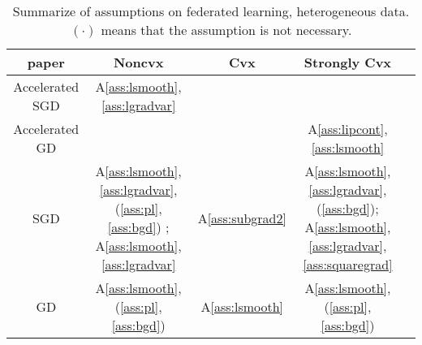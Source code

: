 \begin{table}[h!]
\centering
\small
	\begin{tabular}{|c|c|c|c|c|}\hline
		paper         & Noncvx & Cvx & Strongly Cvx\\ \hline
	Accelerated	SGD   & \cite{huo2020faster} A\ref{ass:lsmooth},\ref{ass:lgradvar} &          &             \\\hline
	Accelerated GD    &        &       &     \cite{liu2019accelerating}A\ref{ass:lipcont},\ref{ass:lsmooth}        \\\hline
	SGD    &   \cite{haddadpour2019convergence} A\ref{ass:lsmooth},\ref{ass:lgradvar},(\ref{ass:pl},\ref{ass:bgd}) ; \cite{huo2020faster}A\ref{ass:lsmooth},\ref{ass:lgradvar}  & A\ref{ass:subgrad2}  &   \cite{haddadpour2019convergence} A\ref{ass:lsmooth},\ref{ass:lgradvar},(\ref{ass:bgd}); \cite{li2019convergence} A\ref{ass:lsmooth},\ref{ass:lgradvar},\ref{ass:squaregrad}     \\\hline
	GD     &   \cite{haddadpour2019convergence}A\ref{ass:lsmooth},(\ref{ass:pl},\ref{ass:bgd})    & \cite{khaled2019first} A\ref{ass:lsmooth} &        \cite{haddadpour2019convergence}A\ref{ass:lsmooth},(\ref{ass:pl},\ref{ass:bgd})    \\\hline
	\end{tabular}
	\caption{Summarize of assumptions on federated learning, heterogeneous data. $(\cdot)$ means that the assumption is not necessary.}
	\label{tb:ass2}
\end{table}

